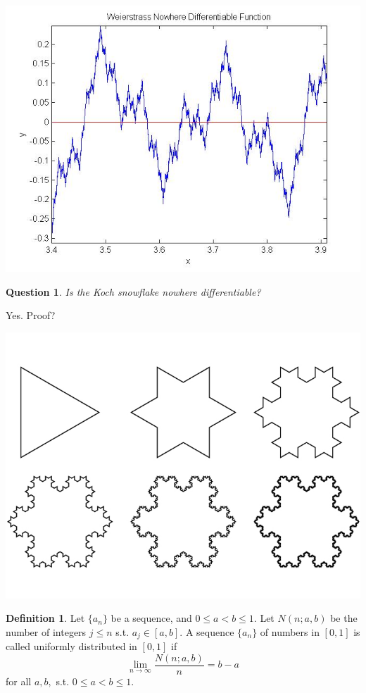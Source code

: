 \documentclass[12pt]{article}
\theoremstyle{plain}
\newtheorem{question}[theorem]{Question}
\theoremstyle{definition}
\newtheorem{definition}[theorem]{Definition}
\theoremstyle{remark}
\begin{document}
\centerline{\includegraphics[scale=0.5]{nodiff1}}

\begin{question}
Is the Koch snowflake nowhere differentiable?
\end{question}

Yes. Proof?

\centerline{\includegraphics[scale=0.5]{biomimicry-koch-snowflake}}

\begin{definition}
Let $\{a_n\}$ be a sequence, and $0 \leq a < b \leq 1$. Let $N(n; a, b)$ be the number of integers $j \leq n$ s.t. $a_j \in [a, b].$ A sequence $\{a_n\}$ of numbers in $[0, 1]$ is called uniformly distributed in $[0, 1]$ if $$\lim_{n \to \infty} \frac{N(n; a, b)}{n} = b - a$$ for all $a, b,$ s.t. $0 \leq a < b \leq 1.$
\end{definition}
\end{document}
